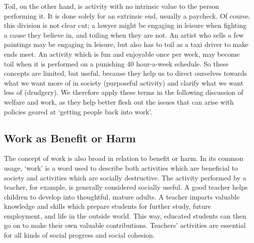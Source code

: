 \documentclass[]{tufte-handout}
\begin{document}
Toil, on the other hand, is activity with no intrinsic value to the
person performing it. It is done solely for an extrinsic end, usually a
paycheck. Of course, this division is not clear cut; a lawyer might be
engaging in leisure when fighting a cause they believe in, and toiling
when they are not. An artist who sells a few paintings may be engaging
in leisure, but also has to toil as a taxi driver to make ends meet. An
activity which is fun and enjoyable once per week, may become toil when
it is performed on a punishing 40 hour-a-week schedule. So these
concepts are limited, but useful, because they help us to direct
ourselves towards what we want more of in society (purposeful activity)
and clarify what we want less of (drudgery). We therefore apply these
terms in the following discussion of welfare and work, as they help
better flesh out the issues that can arise with policies geared at
`getting people back into work'.

\hypertarget{work-as-benefit-or-harm}{%
\subsection{Work as Benefit or Harm}\label{work-as-benefit-or-harm}}

The concept of work is also broad in relation to benefit or harm. In its
common usage, `work' is a word used to describe both activities which
are beneficial to society and activities which are socially destructive.
The activity performed by a teacher, for example, is generally
considered socially useful. A good teacher helps children to develop
into thoughtful, mature adults. A teacher imparts valuable knowledge and
skills which prepare students for further study, future employment, and
life in the outside world. This way, educated students can then go on to
make their own valuable contributions. Teachers' activities are
essential for all kinds of social progress and social cohesion.
\end{document}
